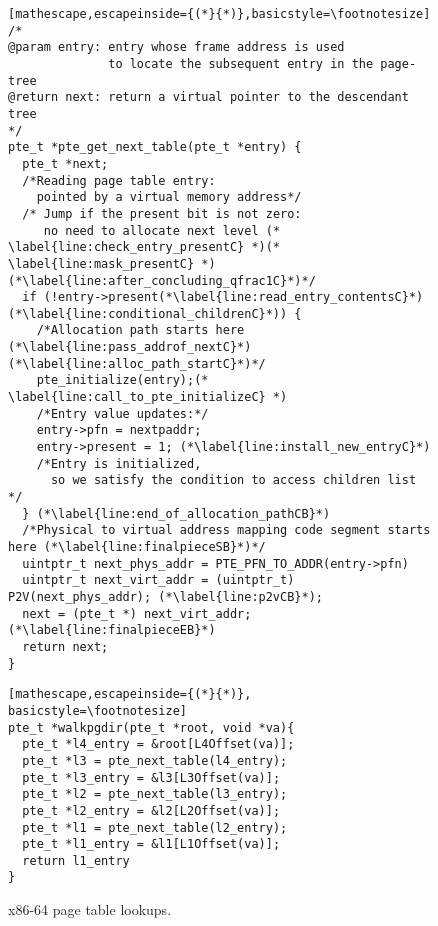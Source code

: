 \begin{figure}
\begin{subfigure}
\begin{tikzpicture}[x=0.75pt,y=0.75pt,yscale=-0.75,xscale=0.75]
\end{tikzpicture}
          \caption{Accessing to the Page Referenced by L1 Entry}
        \label{fig:enter-label}
    \end{subfigure}
    \vfill
\begin{minipage}{.5\textwidth}
\begin{lstlisting}[mathescape,escapeinside={(*}{*)},basicstyle=\footnotesize]
/*
@param entry: entry whose frame address is used 
              to locate the subsequent entry in the page-tree
@return next: return a virtual pointer to the descendant tree
*/
pte_t *pte_get_next_table(pte_t *entry) {
  pte_t *next;
  /*Reading page table entry:
    pointed by a virtual memory address*/
  /* Jump if the present bit is not zero:
     no need to allocate next level (* \label{line:check_entry_presentC} *)(* \label{line:mask_presentC} *)  (*\label{line:after_concluding_qfrac1C}*)*/
  if (!entry->present(*\label{line:read_entry_contentsC}*) (*\label{line:conditional_childrenC}*)) {
    /*Allocation path starts here (*\label{line:pass_addrof_nextC}*)(*\label{line:alloc_path_startC}*)*/
    pte_initialize(entry);(* \label{line:call_to_pte_initializeC} *)
    /*Entry value updates:*/
    entry->pfn = nextpaddr;
    entry->present = 1; (*\label{line:install_new_entryC}*)
    /*Entry is initialized,
      so we satisfy the condition to access children list */
  } (*\label{line:end_of_allocation_pathCB}*)
  /*Physical to virtual address mapping code segment starts here (*\label{line:finalpieceSB}*)*/
  uintptr_t next_phys_addr = PTE_PFN_TO_ADDR(entry->pfn)
  uintptr_t next_virt_addr = (uintptr_t) P2V(next_phys_addr); (*\label{line:p2vCB}*);
  next = (pte_t *) next_virt_addr;(*\label{line:finalpieceEB}*)
  return next;
}
\end{lstlisting}
\end{minipage}
\begin{minipage}{.4\textwidth}
\begin{lstlisting}[mathescape,escapeinside={(*}{*)}, basicstyle=\footnotesize]
pte_t *walkpgdir(pte_t *root, void *va){ 
  pte_t *l4_entry = &root[L4Offset(va)];
  pte_t *l3 = pte_next_table(l4_entry);
  pte_t *l3_entry = &l3[L3Offset(va)];
  pte_t *l2 = pte_next_table(l3_entry);
  pte_t *l2_entry = &l2[L2Offset(va)];  
  pte_t *l1 = pte_next_table(l2_entry);
  pte_t *l1_entry = &l1[L1Offset(va)];  
  return l1_entry
}
\end{lstlisting}
\end{minipage}
    \vspace{-2.5em}
    \caption{x86-64 page table lookups.}
    \label{fig:pagetables}
    \vspace{-1em}
\end{figure}

